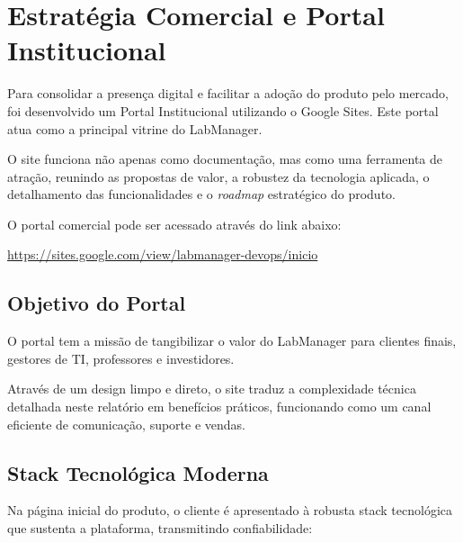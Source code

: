 \documentclass[12pt,a4paper]{article}
\begin{document}
	\section{Estratégia Comercial e Portal Institucional}
	
	Para consolidar a presença digital e facilitar a adoção do produto pelo mercado, foi desenvolvido um Portal Institucional utilizando o Google Sites. Este portal atua como a principal vitrine do LabManager.
	
	O site funciona não apenas como documentação, mas como uma ferramenta de atração, reunindo as propostas de valor, a robustez da tecnologia aplicada, o detalhamento das funcionalidades e o \textit{roadmap} estratégico do produto.
	
	O portal comercial pode ser acessado através do link abaixo:
	
	\begin{center}
		\url{https://sites.google.com/view/labmanager-devops/inicio}
	\end{center}
	
	
	\subsection{Objetivo do Portal}
	
	O portal tem a missão de tangibilizar o valor do LabManager para clientes finais, gestores de TI, professores e investidores. 
	
	Através de um design limpo e direto, o site traduz a complexidade técnica detalhada neste relatório em benefícios práticos, funcionando como um canal eficiente de comunicação, suporte e vendas.
	
	
	\subsection{Stack Tecnológica Moderna}
	
	Na página inicial do produto, o cliente é apresentado à robusta stack tecnológica que sustenta a plataforma, transmitindo confiabilidade:
	
\end{document}
